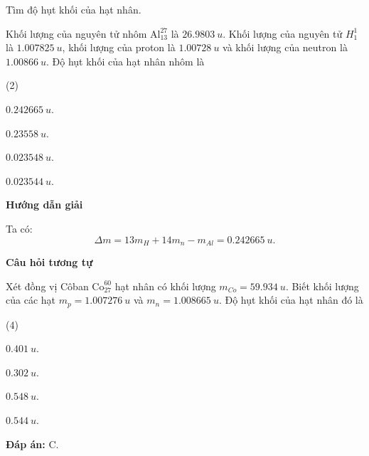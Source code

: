\begin{dang}{Tìm độ hụt khối của hạt nhân.}
{Khối lượng của nguyên tử nhôm $ \text{Al}_{13}^{27} $ là $ \SI{26,9803}{u} $. Khối lượng của nguyên tử $ H_{1}^{1} $ là $ \SI{1,007825}{u} $, khối lượng của proton là $ \SI{1,00728}{u} $ và khối lượng của neutron là $ \SI{1,00866}{u} $. Độ hụt khối của hạt nhân nhôm là
\begin{mcq}(2)
	\item $ \SI{0,242665}{u} $.
	\item $ \SI{0,23558}{u} $.
	\item $ \SI{0,023548}{u} $.
	\item $ \SI{0,023544}{u} $.
\end{mcq}
}
{
\begin{center}
	\textbf{Hướng dẫn giải}
\end{center}
Ta có:
$$
	\Delta m = 13m_{H} + 14m_{n} - m_{Al} = \SI{0,242665}{u}.
$$
\begin{center}
	\textbf{Câu hỏi tương tự}
\end{center}

Xét đồng vị Côban $ \text{Co}_{27}^{60} $ hạt nhân có khối lượng $ m_{Co} = \SI{59,934}{u} $. Biết khối lượng của các hạt $ m_{p} = \SI{1,007276}{u} $ và $ m_{n} = \SI{1,008665}{u} $. Độ hụt khối của hạt nhân đó là
\begin{mcq}(4)
	\item $ \SI{0,401}{u} $.
	\item $ \SI{0,302}{u} $.
	\item $ \SI{0,548}{u} $.
	\item $ \SI{0,544}{u} $.
\end{mcq}
\textbf{Đáp án:} C.
}
	
\end{dang}

